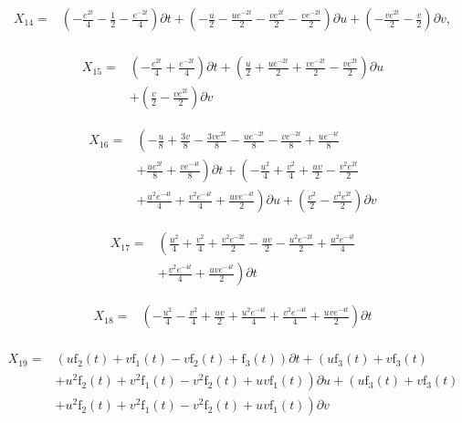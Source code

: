 \begin{align*}
X_{14}=&\left(- \frac{e^{2 t}}{4} - \frac{1}{2} - \frac{e^{- 2 t}}{4} \right)\partial t+\left(- \frac{u}{2} - \frac{u e^{- 2 t}}{2} - \frac{v e^{2 t}}{2} - \frac{v e^{- 2 t}}{2} \right)\partial u+\left(- \frac{v e^{2 t}}{2} - \frac{v}{2} \right)\partial v,\\
\end{align*}

\begin{align*}
X_{15}=&\left(- \frac{e^{2 t}}{4}+\frac{e^{- 2 t}}{4} \right)\partial t+\left(\frac{u}{2}+\frac{u e^{- 2 t}}{2}+\frac{v e^{- 2 t}}{2}- \frac{v e^{2 t}}{2} \right)\partial u\\
&+\left(\frac{v}{2}- \frac{v e^{2 t}}{2} \right)\partial v
\end{align*}

\begin{align*}
X_{16}=&\left(- \frac{u}{8}+\frac{3 v}{8}- \frac{3 v e^{2 t}}{8}- \frac{u e^{- 2 t}}{8}- \frac{v e^{- 2 t}}{8}+\frac{u e^{- 4 t}}{8}\right.\\
&+\left.\frac{u e^{2 t}}{8}+\frac{v e^{- 4 t}}{8} \right)\partial t+\left(- \frac{u^{2}}{4}+\frac{v^{2}}{4}+\frac{u v}{2}- \frac{v^{2} e^{2 t}}{2}\right.\\
&+\left.\frac{u^{2} e^{- 4 t}}{4}+\frac{v^{2} e^{- 4 t}}{4}+\frac{u v e^{- 4 t}}{2} \right)\partial u+\left(\frac{v^{2}}{2}- \frac{v^{2} e^{2 t}}{2} \right)\partial v
\end{align*}

\begin{align*}
X_{17}=&\left(\frac{u^{2}}{4}+\frac{v^{2}}{4}+\frac{v^{2} e^{- 2 t}}{2}- \frac{u v}{2}- \frac{u^{2} e^{- 2 t}}{2}+\frac{u^{2} e^{- 4 t}}{4}\right.\\
&+\left.\frac{v^{2} e^{- 4 t}}{4}+\frac{u v e^{- 4 t}}{2} \right)\partial t
\end{align*}

\begin{align*}
X_{18}=&\left(- \frac{u^{2}}{4}- \frac{v^{2}}{4}+\frac{u v}{2}+\frac{u^{2} e^{- 4 t}}{4}+\frac{v^{2} e^{- 4 t}}{4}+\frac{u v e^{- 4 t}}{2} \right)\partial t\\
\end{align*}

\begin{align*}
X_{19}=&\left(u \operatorname{f_{2}}{\left(t \right)}+v \operatorname{f_{1}}{\left(t \right)}- v \operatorname{f_{2}}{\left(t \right)}+\operatorname{f_{3}}{\left(t \right)} \right)\partial t+\left(u \operatorname{f_{3}}{\left(t \right)}+v \operatorname{f_{3}}{\left(t \right)}\right.\\
&+\left.u^{2} \operatorname{f_{2}}{\left(t \right)}+v^{2} \operatorname{f_{1}}{\left(t \right)}- v^{2} \operatorname{f_{2}}{\left(t \right)}+u v \operatorname{f_{1}}{\left(t \right)} \right)\partial u+\left(u \operatorname{f_{3}}{\left(t \right)}+v \operatorname{f_{3}}{\left(t \right)}\right.\\
&+\left.u^{2} \operatorname{f_{2}}{\left(t \right)}+v^{2} \operatorname{f_{1}}{\left(t \right)}- v^{2} \operatorname{f_{2}}{\left(t \right)}+u v \operatorname{f_{1}}{\left(t \right)} \right)\partial v
\end{align*}



